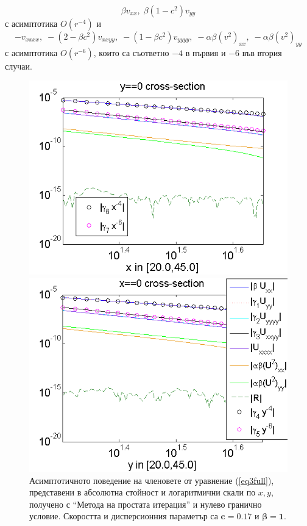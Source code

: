 \documentclass{article}
\newcommand{\rf}[1]{(\ref{#1})}
\begin{document}
$$
\beta v_{xx}, \; \beta (1-c^2) v_{yy}
$$ 
с асимптотика $O(r^{-4})$ и 
$$
- v_{xxxx}, \;  - (2-\beta c^2)v_{xxyy},  \;  - (1-\beta c^2)v_{yyyy}, \;  - \alpha \beta (v^2)_{xx}, \; - \alpha \beta (v^2)_{yy}
$$
с асимптотика $O(r^{-6})$, които са съответно $-4$ в първия и $-6$ във втория случаи.
\begin{figure}[ht]
	\begin{minipage}[b]{0.95\linewidth}
		\includegraphics[width=\linewidth]{AssymptForEachTerm/c017_bt1_5/ChristovIC_AlongX_50_ZB2_bt1_c017_h020_O(h^6).png}
	\end{minipage}
	\begin{minipage}[b]{0.95\linewidth}
		\includegraphics[width=\linewidth]{AssymptForEachTerm/c017_bt1_5/ChristovIC_AlongY_50_ZB2_bt1_c017_h020_O(h^6).png}
	\end{minipage}
	\caption{Асимптотичното поведение на членовете от уравнение \rf{eq3full}, представени в абсолютна стойност и логаритмични скали по $x,y$, получено с ``Метода на простата итерация'' и нулево гранично условие. Скоростта и дисперсионния параметър са $\boldsymbol{c=0.17}$ и $\boldsymbol{\beta = 1}$. }
	\label{fig:assympt_c017bt1}
\end{figure}
\end{document}
